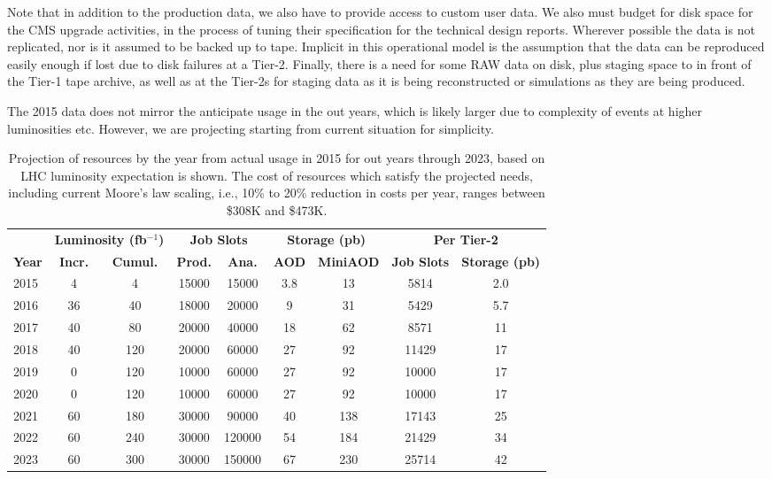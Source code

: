 \documentclass[11pt,a4paper]{article}
\begin{document}
Note that in addition to the production data, we also have to provide
access to custom user data.  We also must budget for disk space for 
the CMS upgrade activities, in the process of tuning their specification
for the technical design reports.  Wherever possible the data is not replicated, 
nor is it assumed to be  backed up to tape. Implicit in this operational model 
is the assumption that the data can be reproduced easily enough if lost due 
to disk failures at a Tier-2.  Finally, there is a need for some RAW data on disk, 
plus staging space to in front of the Tier-1 tape archive, as well as at the Tier-2s
for staging data as it is being reconstructed or simulations as they are being 
produced. 

The 2015 data does not mirror the anticipate usage in the out years,
which is likely larger due to complexity of events at higher luminosities
etc.  However, we are projecting starting from current situation for
simplicity.

\begin{table}
\begin{center}
\begin{tabular}{|l|c|c|c|c|c|c|c|c|}
\hline
&\multicolumn{2}{|c|}{\bf Luminosity (fb$^{-1}$)}&\multicolumn{2}{|c|}{\bf Job Slots}&\multicolumn{2}{|c|}{\bf Storage (pb)}&\multicolumn{2}{|c|}{\bf Per Tier-2} \\ \cline{2-9}
{\bf Year}&{\bf Incr.}&{\bf Cumul.}&{\bf Prod.}&{\bf Ana.}&{\bf AOD}&{\bf MiniAOD}&{\bf Job Slots}&{\bf Storage (pb)} \\  \hline
2015&     4&     4& 15000&   15000& 3.8& 13&   5814&   2.0 \\ \hline
2016&   36&   40& 18000&   20000&   9&  31&   5429&   5.7 \\ \hline
2017&   40&   80& 20000&   40000& 18&  62&   8571&  11 \\ \hline
2018&   40& 120& 20000&   60000& 27&  92& 11429&  17 \\ \hline
2019&    0& 120&  10000&   60000& 27&  92& 10000&  17 \\ \hline
2020&    0& 120&  10000&   60000& 27&  92& 10000&  17 \\ \hline
2021&   60& 180& 30000&   90000& 40& 138& 17143& 25 \\ \hline
2022&   60& 240& 30000& 120000& 54& 184& 21429& 34 \\ \hline
2023&   60& 300& 30000& 150000& 67& 230& 25714& 42 \\ \hline
\end{tabular}
\caption[]
{
Projection of resources by the year from actual usage in 2015 for
out years through 2023, based on LHC luminosity expectation is
shown. The cost of resources which satisfy the projected needs, 
including current Moore's law scaling, i.e., 10\% to 20\% reduction 
in costs per year, ranges between \$308K and \$473K.
}
\label{projection}
\end{center}
\end{table}
\end{document}
